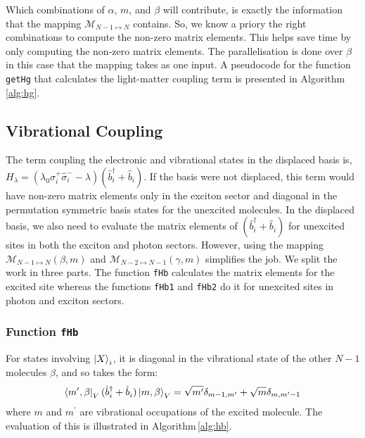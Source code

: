 \documentclass[final,twocolumn]{elsarticle}
\newcommand{\maptoN}{{{\mathcal{M}}}_{N-1 \mapsto N}}
\newcommand{\maptoNa}{{\mathcal{M}}_{N-2 \mapsto N-1}}
\begin{document}
\begin{small}
Which combinations of $\alpha$, $m$, and $\beta$ will contribute, 
is exactly the information that the mapping $\maptoN$ contains.
So, we know a priory the right combinations to compute the non-zero matrix elements.
This helps save time by only computing the non-zero matrix elements.
The parallelisation is done over $\beta$ in this case that the mapping takes as one input.
A pseudocode for the function \texttt{getHg} that calculates the light-matter coupling term is presented in Algorithm\,\ref{alg:hg}.



\subsection{Vibrational Coupling}

The term coupling the electronic and vibrational states in the displaced basis is,
$H_{\lambda}=(\lambda_0 \sigma^+_i \hat \sigma^-_i - \lambda )( \hat b^\dagger_i + \hat b^{}_i )$. 
If the basis were not displaced, this term would have non-zero matrix elements
only in the exciton sector and diagonal in the permutation symmetric basis states for the unexcited molecules.
In the displaced basis,
we also need to evaluate the matrix elements of
$( \hat b^\dagger_i + \hat b^{}_i )$ for unexcited sites
in both the exciton and photon sectors.
However, using the mapping 
$\maptoN(\beta,m)$ and $\maptoNa(\gamma,m)$
simplifies the job.
We split the work in three parts.
The function \texttt{fHb} calculates the matrix elements for the excited site
whereas the functions \texttt{fHb1} and \texttt{fHb2}
do it for unexcited sites in photon and exciton sectors.





\subsubsection{Function \texttt{fHb}}
For states involving $\ket{X}_i$, it is
diagonal in the vibrational state of the other $N-1$ molecules $\beta$, and
so takes the form:
\begin{displaymath}
\bra{m^{\prime},\beta}_V( \hat b^\dagger_i + \hat b^{}_i )\ket{m,\beta}_V= \sqrt{m^{\prime}} \delta_{m-1,m^{\prime}}+ \sqrt{m}\delta_{m,m^{\prime}-1}
\end{displaymath}
where $m$ and $m^{\prime}$ are vibrational occupations of the excited
molecule. 
The evaluation of this is illustrated in Algorithm\,\ref{alg:hb}.


\end{small}
\end{document}
